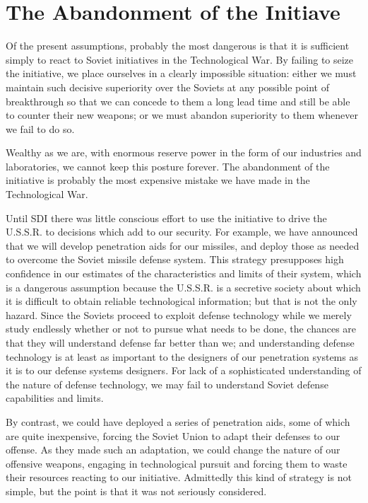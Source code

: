 \section{The Abandonment of the Initiave}
Of the present assumptions, probably the most dangerous is that it is sufficient simply to react to Soviet initiatives in the Technological War. By failing to seize the initiative, we place ourselves in a clearly impossible situation: either we must maintain such decisive superiority over the Soviets at any possible point of breakthrough so that we can concede to them a long lead time and still be able to counter their new weapons; or we must abandon superiority to them whenever we fail to do so.

Wealthy as we are, with enormous reserve power in the form of our industries and laboratories, we cannot keep this posture forever. The abandonment of the initiative is probably the most expensive mistake we have made in the Technological War.

Until SDI there was little conscious effort to use the initiative to drive the U.S.S.R. to decisions which add to our security. For example, we have announced that we will develop penetration aids for our missiles, and deploy those as needed to overcome the Soviet missile defense system. This strategy presupposes high confidence in our estimates of the characteristics and limits of their system, which is a dangerous assumption because the U.S.S.R. is a secretive society about which it is difficult to obtain reliable technological information; but that is not the only hazard. Since the Soviets proceed to exploit defense technology while we merely study endlessly whether or not to pursue what needs to be done, the chances are that they will understand defense far better than we; and understanding defense technology is at least as important to the designers of our penetration systems as it is to our defense systems designers. For lack of a sophisticated understanding of the nature of defense technology, we may fail to understand Soviet defense capabilities and limits.

By contrast, we could have deployed a series of penetration aids, some of which are quite inexpensive, forcing the Soviet Union to adapt their defenses to our offense. As they made such an adaptation, we could change the nature of our offensive weapons, engaging in technological pursuit and forcing them to waste their resources reacting to our initiative. Admittedly this kind of strategy is not simple, but the point is that it was not seriously considered.

